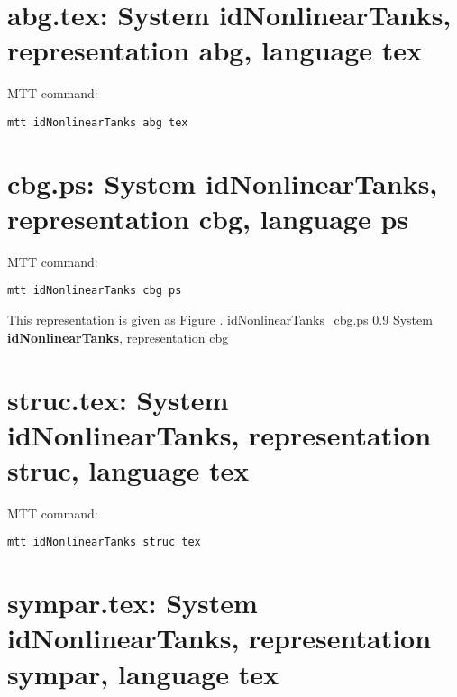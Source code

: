 

\section{\textbf{abg.tex}: System idNonlinearTanks, representation \textbf{abg}, language \textbf{tex}}
\label{sec:idNonlinearTanks_abg.tex}


MTT command:
\begin{verbatim}
mtt idNonlinearTanks abg tex 
\end{verbatim}
  


\section{\textbf{cbg.ps}: System idNonlinearTanks, representation \textbf{cbg}, language \textbf{ps}}
\label{sec:idNonlinearTanks_cbg.ps}


MTT command:
\begin{verbatim}
mtt idNonlinearTanks cbg ps 
\end{verbatim}
This representation is given as Figure .
    {idNonlinearTanks_cbg.ps}
    {0.9}
    {System \textbf{idNonlinearTanks}, representation cbg}


\section{\textbf{struc.tex}: System idNonlinearTanks, representation \textbf{struc}, language \textbf{tex}}
\label{sec:idNonlinearTanks_struc.tex}


MTT command:
\begin{verbatim}
mtt idNonlinearTanks struc tex 
\end{verbatim}
  


\section{\textbf{sympar.tex}: System idNonlinearTanks, representation \textbf{sympar}, language \textbf{tex}}
\label{sec:idNonlinearTanks_sympar.tex}


